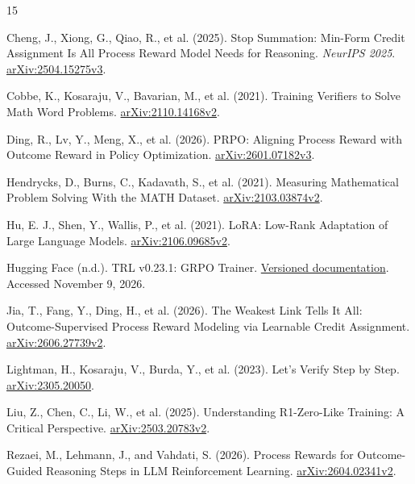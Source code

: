 \documentclass{article}
\begin{document}
\clearpage
\begin{thebibliography}{15}
\raggedright
{}
Cheng, J., Xiong, G., Qiao, R., et al. (2025).
Stop Summation: Min-Form Credit Assignment Is All Process Reward Model Needs for Reasoning.
\emph{NeurIPS 2025}. \href{https://arxiv.org/abs/2504.15275v3}{arXiv:2504.15275v3}.

Cobbe, K., Kosaraju, V., Bavarian, M., et al. (2021).
Training Verifiers to Solve Math Word Problems.
\href{https://arxiv.org/abs/2110.14168v2}{arXiv:2110.14168v2}.

Ding, R., Lv, Y., Meng, X., et al. (2026).
PRPO: Aligning Process Reward with Outcome Reward in Policy Optimization.
\href{https://arxiv.org/abs/2601.07182v3}{arXiv:2601.07182v3}.

Hendrycks, D., Burns, C., Kadavath, S., et al. (2021).
Measuring Mathematical Problem Solving With the MATH Dataset.
\href{https://arxiv.org/abs/2103.03874v2}{arXiv:2103.03874v2}.

Hu, E. J., Shen, Y., Wallis, P., et al. (2021).
LoRA: Low-Rank Adaptation of Large Language Models.
\href{https://arxiv.org/abs/2106.09685v2}{arXiv:2106.09685v2}.

Hugging Face (n.d.). TRL v0.23.1: GRPO Trainer.
\href{https://huggingface.co/docs/trl/v0.23.1/grpo_trainer}{Versioned documentation}. Accessed November 9, 2026.

Jia, T., Fang, Y., Ding, H., et al. (2026).
The Weakest Link Tells It All: Outcome-Supervised Process Reward Modeling via Learnable Credit Assignment.
\href{https://arxiv.org/abs/2606.27739v2}{arXiv:2606.27739v2}.

Lightman, H., Kosaraju, V., Burda, Y., et al. (2023).
Let's Verify Step by Step. \href{https://arxiv.org/abs/2305.20050}{arXiv:2305.20050}.

Liu, Z., Chen, C., Li, W., et al. (2025).
Understanding R1-Zero-Like Training: A Critical Perspective.
\href{https://arxiv.org/abs/2503.20783v2}{arXiv:2503.20783v2}.

Rezaei, M., Lehmann, J., and Vahdati, S. (2026).
Process Rewards for Outcome-Guided Reasoning Steps in LLM Reinforcement Learning.
\href{https://arxiv.org/abs/2604.02341v2}{arXiv:2604.02341v2}.


\end{thebibliography}
\end{document}
